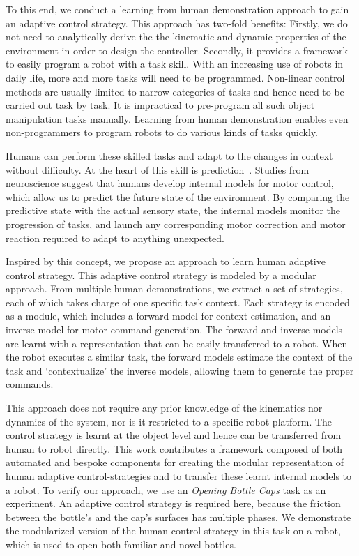 To this end, we conduct a learning from human demonstration approach to gain an adaptive control strategy. This approach has two-fold benefits: Firstly, we do not need to analytically derive the the kinematic and dynamic properties of the environment in order to design the controller. Secondly, it provides a framework to easily program a robot with a task skill. With an increasing use of robots in daily life, more and more tasks will need to be programmed. Non-linear control methods are usually limited to narrow categories of tasks and hence need to be carried out task by task. It is impractical to pre-program all such object manipulation tasks manually. Learning from human demonstration enables even non-programmers to program robots to do various kinds of tasks quickly.

Humans can perform these skilled tasks and adapt to the changes in context without difficulty. At the heart of this skill is prediction~\cite{flanagan2006control}. Studies from neuroscience
suggest that humans develop internal models for motor control, which
allow us to predict the future state of the environment. By comparing
the predictive state with the actual sensory state, the internal
models monitor the progression of  tasks, and launch any
corresponding motor correction and motor reaction required to
adapt to anything unexpected.


Inspired by this concept, we propose an approach to learn human
adaptive control strategy. This adaptive control strategy is modeled by a modular
approach.
From multiple human demonstrations, we extract a set of strategies,
each of which takes charge of one specific task context.
Each strategy is encoded as a module, which includes a forward model for context
estimation, and an inverse model for motor command generation. 
The forward and inverse models are learnt with a representation
that can be easily transferred to a
robot. When the robot executes a similar task, the forward models
estimate the context of the task and
`contextualize' the inverse models, allowing them to generate the proper commands.


This approach does not require any prior knowledge of the kinematics nor dynamics of the system, nor is it restricted to a specific robot platform. The control strategy is learnt at the object level and hence can be transferred from human to robot directly.
This work contributes a framework composed of both automated and bespoke components for creating the modular representation of
human adaptive control-strategies 
and to transfer these learnt internal models to a robot. To verify our
approach, we use an \emph{Opening Bottle Caps} task as an experiment. An adaptive control strategy is required here, because the
friction between the bottle's and the cap's surfaces has multiple phases. We demonstrate the modularized version of the human control
strategy in this task on a robot, which is used to open both familiar and novel bottles.


